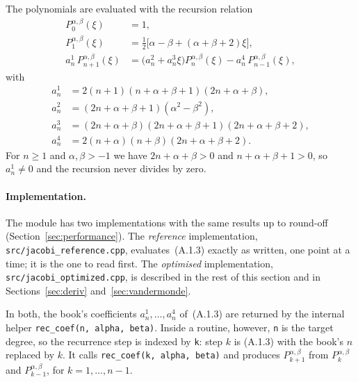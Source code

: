 \documentclass[11pt,a4paper]{article}
\newcommand{\Jac}[3]{P_{#1}^{#2,#3}}            %
\newcommand{\Pab}[1]{P_{#1}^{\alpha,\beta}}     %
\newcommand{\code}[1]{\texttt{#1}}
\begin{document}
The polynomials are evaluated with the recursion relation
\begin{equation}
\begin{aligned}
  \Jac{0}{\alpha}{\beta}(\xi) &= 1,\\
  \Jac{1}{\alpha}{\beta}(\xi) &= \tfrac12\bigl[\alpha-\beta+(\alpha+\beta+2)\xi\bigr],\\
  a_n^1\,\Pab{n+1}(\xi) &= \bigl(a_n^2 + a_n^3 \xi\bigr)\Pab{n}(\xi) - a_n^4\,\Pab{n-1}(\xi),
\end{aligned}
\tag{A.1.3}
\end{equation}
with
\begin{align*}
  a_n^1 &= 2(n+1)(n+\alpha+\beta+1)(2n+\alpha+\beta),\\
  a_n^2 &= (2n+\alpha+\beta+1)(\alpha^2-\beta^2),\\
  a_n^3 &= (2n+\alpha+\beta)(2n+\alpha+\beta+1)(2n+\alpha+\beta+2),\\
  a_n^4 &= 2(n+\alpha)(n+\beta)(2n+\alpha+\beta+2).
\end{align*}
For $n\ge1$ and $\alpha,\beta>-1$ we have $2n+\alpha+\beta>0$ and
$n+\alpha+\beta+1>0$, so $a_n^1\neq0$ and the recursion never divides by zero.

\paragraph{Implementation.}
The module has two implementations with the same results up to round-off
(Section~\ref{sec:performance}). The \emph{reference} implementation,
\code{src/jacobi\_reference.cpp}, evaluates~(A.1.3) exactly as written, one
point at a time; it is the one to read first. The \emph{optimised}
implementation, \code{src/jacobi\_optimized.cpp}, is described in the rest of
this section and in Sections~\ref{sec:deriv} and~\ref{sec:vandermonde}.

In both, the book's coefficients $a_n^1,\dots,a_n^4$ of~(A.1.3) are
returned by the internal helper \code{rec\_coef(n, alpha, beta)}. Inside a
routine, however,
\code{n} is the target degree, so the recurrence step is indexed by
\code{k}: step $k$ is (A.1.3) with the book's $n$ replaced by $k$. It calls
\code{rec\_coef(k, alpha, beta)} and produces $\Pab{k+1}$ from $\Pab{k}$ and
$\Pab{k-1}$, for $k=1,\dots,n-1$.
\end{document}
